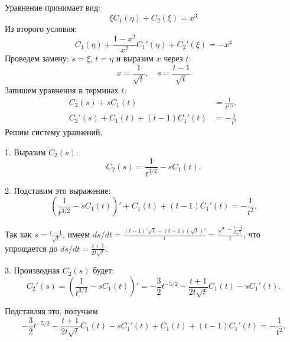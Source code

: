 \documentclass[a4paper,12pt]{article}
\begin{document}
        Уравнение принимает вид:
        \begin{equation*}
            \xi C_1(\eta) + C_2(\xi) = x^3
        \end{equation*}
        Из второго условия:
        \begin{equation*}
             C_1(\eta) + \frac{1 - x^2}{x^2} C_1'(\eta) + C_2'(\xi) = -x^4
        \end{equation*}
        Проведем замену: $ s = \xi $, $ t = \eta $ и выразим $ x $ через $ t $:
        \begin{equation*}
            x = \frac{1}{\sqrt{t}}, \quad s = \frac{t - 1}{\sqrt{t}}
        \end{equation*}
        Запишем уравнения в терминах $ t $:
        \begin{align*}
            C_2(s) + s C_1(t) &= \frac{1}{t^{3/2}},\\
            C_2'(s) + C_1(t) + (t - 1) C_1'(t) &= -\frac{1}{t^2}
        \end{align*}
        Решим систему уравнений.


        1. Выразим $ C_2(s) $:
        \begin{equation*}
            C_2(s) = \frac{1}{t^{3/2}} - s C_1(t).
        \end{equation*}
        
     2. Подставим это выражение:
        \begin{equation*}
            \left( \frac{1}{t^{3/2}} - s C_1(t) \right)' + C_1(t) + (t - 1) C_1'(t) = -\frac{1}{t^2}.
        \end{equation*}
        
        Так как $ s = \frac{t - 1}{\sqrt{t}} $, имеем $ ds/dt = \frac{(t - 1)' \sqrt{t} - (t - 1) (\sqrt{t})'}{t} = \frac{\sqrt{t} - \frac{t - 1}{2 \sqrt{t}}}{t} $, что упрощается до $ ds/dt = \frac{t + 1}{2t \sqrt{t}} $.
     
     3. Производная $ C_2(s) $ будет:
        \begin{equation*}
            C_2'(s) = \left( \frac{1}{t^{3/2}} - s C_1(t) \right)' = -\frac{3}{2} t^{-5/2} - \frac{t + 1}{2t \sqrt{t}} C_1(t) - s C_1'(t).
        \end{equation*}
        
        Подставляя это, получаем
        \begin{equation*}
            -\frac{3}{2} t^{-5/2} - \frac{t + 1}{2t \sqrt{t}} C_1(t) - s C_1'(t) + C_1(t) + (t - 1) C_1'(t) = -\frac{1}{t^2}.
        \end{equation*}
     
\end{document}
